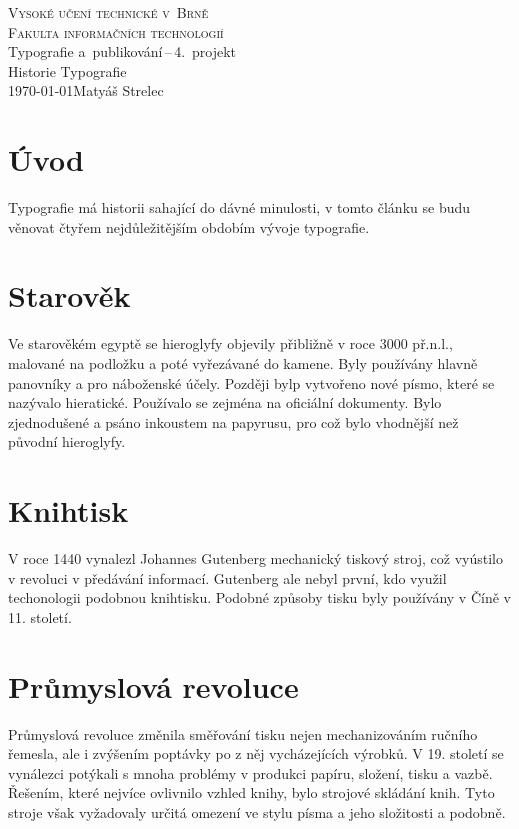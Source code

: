 \documentclass[a4paper, 11pt]{article}
\begin{document}
\begin{titlepage}
    \begin{center}
		{\Huge{\textsc{Vysoké učení technické v~Brně}}\\
        \huge{\textsc{Fakulta informačních technologií}}\\}
		\LARGE{Typografie a~publikování\,{}--\,{}4.\ projekt}\\
        \Huge{Historie Typografie\\}
        {\Large{\today \hfill Matyáš Strelec}}
	\end{center}
\end{titlepage}

\pagebreak

\section{Úvod}
Typografie má historii sahající do dávné minulosti, v tomto článku se budu věnovat
čtyřem nejdůležitějším obdobím vývoje typografie.

\section{Starověk}
Ve starověkém egyptě se hieroglyfy objevily přibližně v roce 3000 př.n.l., malované na podložku a poté
vyřezávané do kamene. Byly používány hlavně panovníky a pro náboženské účely. Později bylp vytvořeno nové
písmo, které se nazývalo hieratické. Používalo se zejména na oficiální dokumenty. Bylo zjednodušené a psáno 
inkoustem na papyrusu, pro což bylo vhodnější než původní hieroglyfy\cite{betro1996}\cite{Kleckova2015}.

\section{Knihtisk}
V roce 1440 vynalezl Johannes Gutenberg mechanický tiskový stroj, což vyústilo v revoluci v předávání 
informací\cite{barbier2017}. Gutenberg ale nebyl první, kdo využil techonologii podobnou knihtisku.
Podobné způsoby tisku byly používány v Číně v 11. století\cite{duchesne2006}\cite{musson1958}.


\section{Průmyslová revoluce}
Průmyslová revoluce změnila směřování tisku nejen mechanizováním ručního řemesla, ale i zvýšením poptávky po
z něj vycházejících výrobků. V 19. století se vynálezci potýkali s mnoha problémy v produkci papíru,
složení, tisku a vazbě. Řešením, které nejvíce ovlivnilo vzhled knihy, bylo strojové skládání knih.
Tyto stroje však vyžadovaly určitá omezení ve stylu písma a jeho složitosti a podobně\cite{history2018}.
\end{document}
